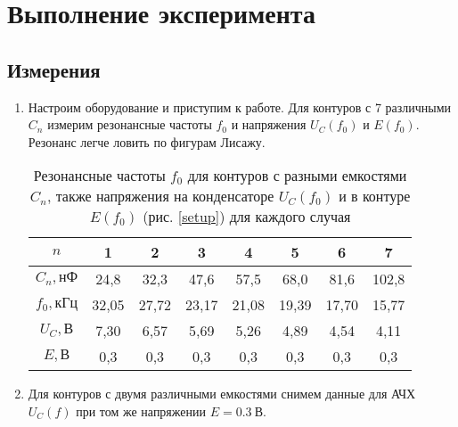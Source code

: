 \documentclass{lab}
\begin{document}
\newpage

\section*{Выполнение эксперимента}

\subsection*{Измерения}

\vspace{0.5cm}

\begin{enumerate}

\item
Настроим оборудование и приступим к работе. Для контуров с 7 различными $ C_n $ измерим
резонансные частоты $ f_{0} $ и напряжения $ U_C(f_{0}) $ и $ E(f_{0}) $.
Резонанс легче ловить по фигурам Лисажу.

\begin{table}[H]
	\centering
	\begin{tabular}{|c|ccccccc|}
		\hline
		$n$			&1		&2		&3		&4		&5		&6		&7		\\ \hline
		$C_n, нФ$	&24,8	&32,3	&47,6	&57,5	&68,0	&81,6	&102,8	\\ %
		$f_0, кГц$	&32,05	&27,72	&23,17	&21,08	&19,39	&17,70	&15,77	\\ %
		$U_C, В$	&7,30	&6,57	&5,69	&5,26	&4,89	&4,54	&4,11	\\ %
		$E, В$		&0,3	&0,3	&0,3	&0,3	&0,3	&0,3	&0,3	\\ \hline
	\end{tabular}
	\caption{\footnotesize 
	Резонансные частоты $ f_{0} $ для контуров с разными емкостями $ C_n $, также
	напряжения на конденсаторе $ U_C(f_{0}) $ и в контуре $ E(f_{0}) $
	(рис. \ref{setup}) для каждого случая
	}
	\label{tab0}
\end{table}

\vspace{0.7cm}

\item
Для контуров с двумя различными емкостями снимем данные для АЧХ $ U_C(f) $ при том же напряжении $ E = 0.3~В$.


\end{enumerate}
\end{document}

